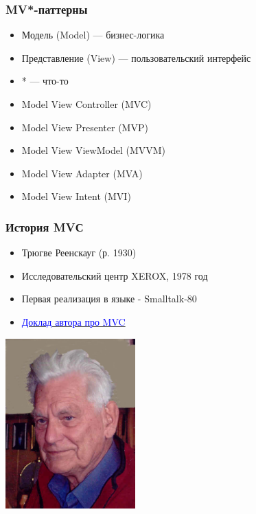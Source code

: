 \documentclass[aspectratio=169]{beamer}
\begin{document}
\begin{frame}[fragile]
  \transwipe[direction=90]
  \frametitle{MV*-паттерны}
  \begin{itemize}
    \item Модель (Model) --- бизнес-логика
    \item Представление (View) --- пользовательский интерфейс
    \item * --- что-то
  \end{itemize}
  \begin{itemize}
    \item Model View Controller (MVC)
    \item Model View Presenter (MVP)
    \item Model View ViewModel (MVVM)
    \item Model View Adapter (MVA)
    \item Model View Intent (MVI)
  \end{itemize}

\end{frame}

\begin{frame}[fragile]
  \transwipe[direction=90]
  \frametitle{История MVС}
  \begin{minipage}{.65\textwidth}
    \begin{itemize}
      \item Трюгве Реенскауг (р. 1930)
      \item Исследовательский центр XEROX, 1978 год
      \item Первая реализация в языке - Smalltalk-80
      \item \href{https://folk.universitetetioslo.no/trygver/2003/javazone-jaoo/MVC_pattern.pdf}{\textcolor{blue}{Доклад автора про MVC}}
    \end{itemize}
  \end{minipage}
  \begin{minipage}{.31\textwidth}
      \includegraphics[width=5cm]{pictures/Trygve_Reenskaug.jpg}
  \end{minipage}

\end{frame}
\end{document}
